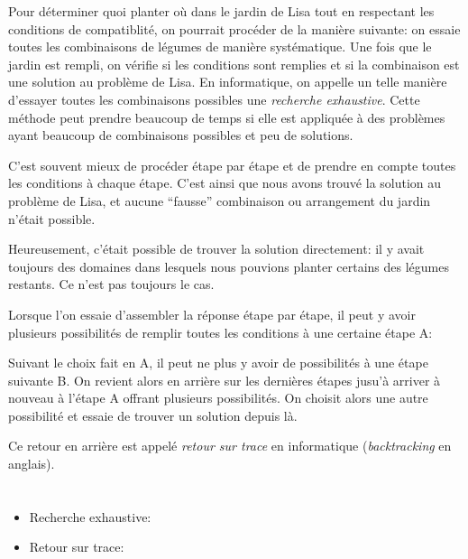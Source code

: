 {{Pour déterminer quoi planter où dans le jardin de Lisa tout en respectant les conditions de compatiblité, on pourrait procéder de la manière suivante: on essaie toutes les combinaisons de légumes de manière systématique. Une fois que le jardin est rempli, on vérifie si les conditions sont remplies et si la combinaison est une solution au problème de Lisa. En informatique, on appelle un telle manière d’essayer toutes les combinaisons possibles une \emph{recherche exhaustive}. Cette méthode peut prendre beaucoup de temps si elle est appliquée à des problèmes ayant beaucoup de combinaisons possibles et peu de solutions.

C’est souvent mieux de procéder étape par étape et de prendre en compte toutes les conditions à chaque étape. C’est ainsi que nous avons trouvé la solution au problème de Lisa, et aucune “fausse” combinaison ou arrangement du jardin n’était possible.

Heureusement, c’était possible de trouver la solution directement: il y avait toujours des domaines dans lesquels nous pouvions planter certains des légumes restants. Ce n’est pas toujours le cas.

Lorsque l’on essaie d’assembler la réponse étape par étape, il peut y avoir plusieurs possibilités de remplir toutes les conditions à une certaine étape A:

{\centering%
\par}

Suivant le choix fait en A, il peut ne plus y avoir de possibilités à une étape suivante B. On revient alors en arrière sur les dernières étapes jusu’à arriver à nouveau à l’étape A offrant plusieurs possibilités. On choisit alors une autre possibilité et essaie de trouver un solution depuis là.

Ce retour en arrière est appelé \emph{retour sur trace} en informatique (\emph{backtracking} en anglais).



\section*{\BrochureWebsitesAndKeywords}
{\raggedright
\begin{itemize}
  \item Recherche exhaustive: \href{https://fr.wikipedia.org/wiki/Recherche_exhaustive}{}
  \item Retour sur trace: \href{https://fr.wikipedia.org/wiki/Retour_sur_trace}{}
\end{itemize}


}}}
